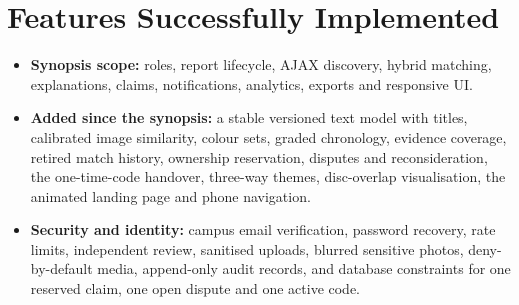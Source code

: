 \documentclass[12pt,a4paper,oneside]{report}
\begin{document}
\section{Features Successfully Implemented}
\begin{itemize}
  \item \textbf{Synopsis scope:} roles, report lifecycle, AJAX discovery, hybrid matching, explanations, claims, notifications, analytics, exports and responsive UI.
  \item \textbf{Added since the synopsis:} a stable versioned text model with titles, calibrated image similarity, colour sets, graded chronology, evidence coverage, retired match history, ownership reservation, disputes and reconsideration, the one-time-code handover, three-way themes, disc-overlap visualisation, the animated landing page and phone navigation.
  \item \textbf{Security and identity:} campus email verification, password recovery, rate limits, independent review, sanitised uploads, blurred sensitive photos, deny-by-default media, append-only audit records, and database constraints for one reserved claim, one open dispute and one active code.
\end{itemize}
\end{document}
